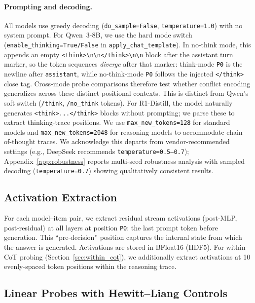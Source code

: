 \documentclass{article}
\newcommand{\pzero}{\texttt{P0}}
\begin{document}
\paragraph{Prompting and decoding.}
All models use greedy decoding (\texttt{do\_sample=False}, \texttt{temperature=1.0})
with no system prompt. For Qwen~3-8B, we use the hard mode switch
(\texttt{enable\_thinking=True/False} in \texttt{apply\_chat\_template}).
In no-think mode, this appends an empty
\texttt{<think>{\textbackslash}n{\textbackslash}n</think>{\textbackslash}n{\textbackslash}n}
block after the assistant turn marker, so the token sequences
\emph{diverge} after that marker: think-mode \pzero{} is the
newline after \texttt{assistant}, while no-think-mode \pzero{} follows
the injected \texttt{</think>} close tag.  Cross-mode probe
comparisons therefore test whether conflict encoding generalizes
across these distinct positional contexts. This is distinct from
Qwen's soft switch (\texttt{/think}, \texttt{/no\_think} tokens). For R1-Distill, the model naturally generates
\texttt{<think>...\allowbreak</think>} blocks without prompting;
we parse these to extract thinking-trace positions.
We use \texttt{max\_new\_tokens=128} for standard models and
\texttt{max\_new\_tokens=2048} for reasoning models to accommodate
chain-of-thought traces. We acknowledge this departs from vendor-recommended
settings (e.g., DeepSeek recommends \texttt{temperature=0.5--0.7});
Appendix~\ref{app:robustness} reports multi-seed robustness analysis with sampled decoding
(\texttt{temperature=0.7}) showing qualitatively consistent results.

\subsection{Activation Extraction}

For each model--item pair, we extract residual stream activations
(post-MLP, post-residual) at all layers at position \pzero{}: the
last prompt token before generation.  This ``pre-decision'' position
captures the internal state from which the answer is generated.
Activations are stored in BFloat16 (HDF5).  For within-CoT probing
(Section~\ref{sec:within_cot}), we additionally extract activations
at 10 evenly-spaced token positions within the reasoning trace.

\subsection{Linear Probes with Hewitt--Liang Controls}
\label{sec:probes}
\end{document}
